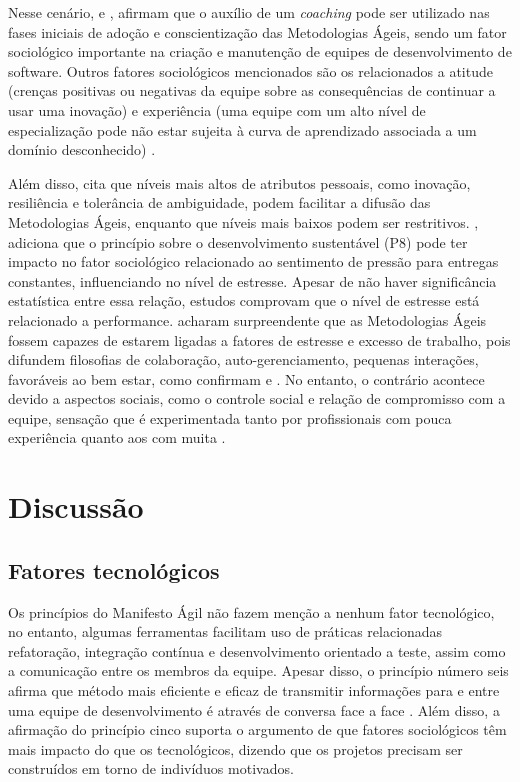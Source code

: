 Nesse cenário, \citeauthor{Senapathi2014} \citeyear{Senapathi2014} e \citeauthor{Solinski2016} \citeyear{Solinski2016}, afirmam que o auxílio de um \textit{coaching} pode ser utilizado nas fases iniciais de adoção e conscientização das Metodologias Ágeis, sendo um fator sociológico importante na criação e manutenção de equipes de desenvolvimento de software. Outros fatores sociológicos mencionados são os relacionados a atitude (crenças positivas ou negativas da equipe sobre as consequências de continuar a usar uma inovação) e experiência (uma equipe com um alto nível de especialização pode não estar sujeita à curva de aprendizado associada a um domínio desconhecido) \citeauthor{Senapathi2012} \citeyear{Senapathi2012}.

Além disso, \citeauthor{Senapathi2012} \citeyear{Senapathi2012} cita que níveis mais altos de atributos pessoais, como inovação, resiliência e tolerância de ambiguidade, podem facilitar a difusão das Metodologias Ágeis, enquanto que níveis mais baixos podem ser restritivos. \citeauthor{Laanti2013} \citeyear{Laanti2013}, adiciona que o princípio sobre o desenvolvimento sustentável (P8) pode ter impacto no fator sociológico relacionado ao sentimento de pressão para entregas constantes, influenciando no nível de estresse. Apesar de não haver significância estatística entre essa relação, estudos comprovam que o nível de estresse está relacionado a performance. \citeauthor{B2016} \citeyear{B2016} acharam surpreendente que as Metodologias Ágeis fossem capazes de estarem ligadas a fatores de estresse e excesso de trabalho, pois difundem filosofias de colaboração, auto-gerenciamento, pequenas interações, favoráveis ao bem estar, como confirmam \citeauthor{Solinski2016} \citeyear{Solinski2016} e \citeauthor{Kurapati2012} \citeyear{Kurapati2012}. No entanto, o contrário acontece devido a aspectos sociais, como o controle social e relação de compromisso com a equipe, sensação que é experimentada tanto por profissionais com pouca experiência quanto aos com muita \citeauthor{B2016} \citeyear{B2016}.

\section{Discussão}

\subsection{Fatores tecnológicos}

Os princípios do Manifesto Ágil \cite{Beck2001} não fazem menção a nenhum fator tecnológico, no entanto, algumas ferramentas facilitam uso de práticas relacionadas refatoração, integração contínua e desenvolvimento orientado a teste, assim como a comunicação entre os membros da equipe. Apesar disso, o princípio número seis  afirma que método mais eficiente e eficaz de transmitir informações para e entre uma equipe de desenvolvimento é através de conversa face a face \cite{Beck2001}. Além disso, a afirmação do princípio cinco suporta o argumento de que fatores sociológicos têm mais impacto do que os tecnológicos, dizendo que os projetos precisam ser construídos em torno de indivíduos motivados.

